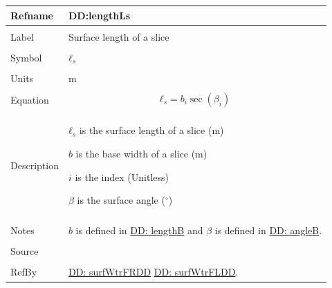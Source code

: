 \documentclass[12pt]{article}
\begin{document}
\noindent \begin{minipage}{\textwidth}
\begin{tabular}{p{} p{}}
\toprule \textbf{Refname} & \textbf{DD:lengthLs}
\label{DD:lengthLs}
\\ \midrule \\
Label & Surface length of a slice
        \\ \midrule \\
        Symbol & ${ℓ_{s}}$
                 \\ \midrule \\
                 Units & m
                         \\ \midrule \\
                         Equation & \begin{displaymath}
                                    {ℓ_{s}}=b_{i} \sec\left(β_{i}\right)
                                    \end{displaymath}
                                    \\ \midrule \\
                                    Description & \begin{symbDescription}
                                                  \item{${ℓ_{s}}$ is the surface length of a slice (m)}
                                                  \item{$b$ is the base width of a slice (m)}
                                                  \item{$i$ is the index (Unitless)}
                                                  \item{$β$ is the surface angle (${}^{\circ}$)}
                                                  \end{symbDescription}
                                                  \\ \midrule \\
                                                  Notes & $b$ is defined in \hyperref[DD:lengthB]{DD: lengthB} and $β$ is defined in \hyperref[DD:angleB]{DD: angleB}.
                                                          \\ \midrule \\
                                                          Source & \cite{fredlund1977}
                                                                   \\ \midrule \\
                                                                   RefBy & \hyperref[DD:surfWtrFRDD]{DD: surfWtrFRDD} \hyperref[DD:surfWtrFLDD]{DD: surfWtrFLDD}.
\\ \bottomrule \end{tabular}
\end{minipage}
\par~
\end{document}
